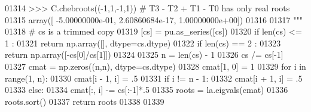 \begin{DoxyCode}
01314 \textcolor{stringliteral}{    >>> C.chebroots((-1,1,-1,1)) # T3 - T2 + T1 - T0 has only real roots}
01315 \textcolor{stringliteral}{    array([ -5.00000000e-01,   2.60860684e-17,   1.00000000e+00])}
01316 \textcolor{stringliteral}{}
01317 \textcolor{stringliteral}{    """}
01318     \textcolor{comment}{# cs is a trimmed copy}
01319     [cs] = pu.as\_series([cs])
01320     \textcolor{keywordflow}{if} len(cs) <= 1 :
01321         \textcolor{keywordflow}{return} np.array([], dtype=cs.dtype)
01322     \textcolor{keywordflow}{if} len(cs) == 2 :
01323         \textcolor{keywordflow}{return} np.array([-cs[0]/cs[1]])
01324 
01325     n = len(cs) - 1
01326     cs /= cs[-1]
01327     cmat = np.zeros((n,n), dtype=cs.dtype)
01328     cmat[1, 0] = 1
01329     \textcolor{keywordflow}{for} i \textcolor{keywordflow}{in} range(1, n):
01330         cmat[i - 1, i] = .5
01331         \textcolor{keywordflow}{if} i != n - 1:
01332             cmat[i + 1, i] = .5
01333         \textcolor{keywordflow}{else}:
01334             cmat[:, i] -= cs[:-1]*.5
01335     roots = la.eigvals(cmat)
01336     roots.sort()
01337     \textcolor{keywordflow}{return} roots
01338 
01339 
\end{DoxyCode}
\hypertarget{namespacepyneb_1_1utils_1_1chebyshev_ac07c70b217882a8c0a731ce9fdf743f0}{}
